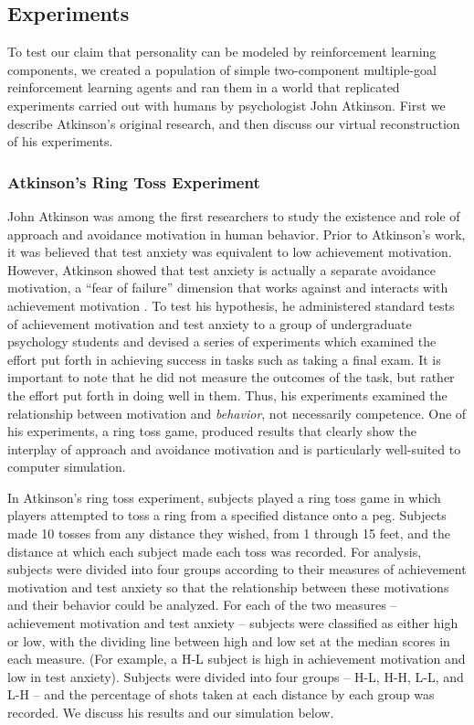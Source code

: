 \subsection{Experiments}

To test our claim that personality can be modeled by reinforcement learning components, we created a population of simple two-component multiple-goal reinforcement learning agents and ran them in a world that replicated experiments carried out with humans by psychologist John Atkinson.  First we describe Atkinson's original research, and then discuss our virtual reconstruction of his experiments.

\subsubsection{Atkinson's Ring Toss Experiment}\label{sec:ring-toss}

John Atkinson was among the first researchers to study the existence and role of approach and avoidance motivation in human behavior. Prior to Atkinson's work, it was believed that test anxiety was equivalent to low achievement motivation.  However, Atkinson showed that test anxiety is actually a separate avoidance motivation, a ``fear of failure'' dimension that works against and interacts with achievement motivation \cite{atkinson1960achievement}.  To test his hypothesis, he administered standard tests of achievement motivation and test anxiety to a group of undergraduate psychology students and devised a series of experiments which examined the effort put forth in achieving success in tasks such as taking a final exam.  It is important to note that he did not measure the outcomes of the task, but rather the effort put forth in doing well in them.  Thus, his experiments examined the relationship between motivation and {\em behavior}, not necessarily competence.  One of his experiments, a ring toss game, produced results that clearly show the interplay of approach and avoidance motivation and is particularly well-suited to computer simulation.

In Atkinson's ring toss experiment, subjects played a ring toss game in which players attempted to toss a ring from a specified distance onto a peg.  Subjects made 10 tosses from any distance they wished, from 1 through 15 feet, and the distance at which each subject made each toss was recorded.  For analysis, subjects were divided into four groups according to their measures of achievement motivation and test anxiety so that the relationship between these motivations and their behavior could be analyzed.  For each of the two measures -- achievement motivation and test anxiety -- subjects were classified as either high or low, with the dividing line between high and low set at the median scores in each measure.  (For example, a H-L subject is high in achievement motivation and low in test anxiety).  Subjects were divided into four groups -- H-L, H-H, L-L, and L-H -- and the percentage of shots taken at each distance by each group was recorded. We discuss his results and our simulation below.

